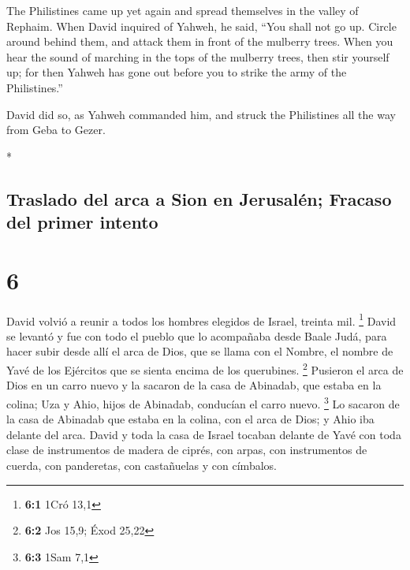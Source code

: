\begin{paracol}{2}
\begin{otherlanguage}{english}
 The Philistines came up yet again and spread themselves
in the valley of Rephaim.  When David inquired of Yahweh,
he said, ``You shall not go up. Circle around behind them, and attack
them in front of the mulberry trees.  When you hear the
sound of marching in the tops of the mulberry trees, then stir yourself
up; for then Yahweh has gone out before you to strike the army of the
Philistines.''

 David did so, as Yahweh commanded him, and struck the
Philistines all the way from Geba to Gezer.

\end{otherlanguage}

\switchcolumn[0]*

\hypertarget{traslado-del-arca-a-sion-en-jerusaluxe9n-fracaso-del-primer-intento}{%
\subsection{Traslado del arca a Sion en Jerusalén; Fracaso del primer
intento}\label{traslado-del-arca-a-sion-en-jerusaluxe9n-fracaso-del-primer-intento}}

\hypertarget{section-10}{%
\section{6}\label{section-10}}

 David volvió a reunir a todos los hombres elegidos de
Israel, treinta mil. \footnote{\textbf{6:1} 1Cró 13,1} 
David se levantó y fue con todo el pueblo que lo acompañaba desde Baale
Judá, para hacer subir desde allí el arca de Dios, que se llama con el
Nombre, el nombre de Yavé de los Ejércitos que se sienta encima de los
querubines. \footnote{\textbf{6:2} Jos 15,9; Éxod 25,22} 
Pusieron el arca de Dios en un carro nuevo y la sacaron de la casa de
Abinadab, que estaba en la colina; Uza y Ahio, hijos de Abinadab,
conducían el carro nuevo. \footnote{\textbf{6:3} 1Sam 7,1}
 Lo sacaron de la casa de Abinadab que estaba en la
colina, con el arca de Dios; y Ahio iba delante del arca. 
David y toda la casa de Israel tocaban delante de Yavé con toda clase de
instrumentos de madera de ciprés, con arpas, con instrumentos de cuerda,
con panderetas, con castañuelas y con címbalos.


\end{paracol}
